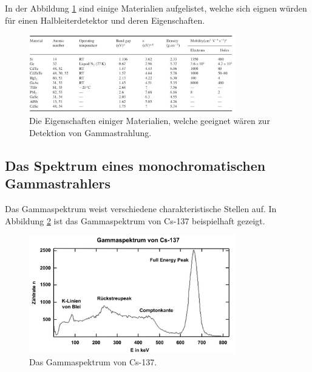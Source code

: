 In der Abbildung \ref{fig:halbleitermatrialien} sind einige Materialien aufgelistet, welche sich eignen würden für einen Halbleiterdetektor und deren Eigenschaften.

\begin{figure}[H]
    \centering
    \includegraphics[width=0.8\textwidth]{content/grafik/passende.jpg}
    \caption{Die Eigenschaften einiger Materialien, welche geeignet wären zur Detektion von Gammastrahlung. \cite{gamma_ray}}
    \label{fig:halbleitermatrialien}
\end{figure}

\subsection{Das Spektrum eines monochromatischen Gammastrahlers}
\label{sec:Gammastrahlung}

Das Gammaspektrum weist verschiedene charakteristische Stellen auf. In Abbildung \ref{fig:gamma-cs} ist das Gammaspektrum von
Cs-137 beispielhaft gezeigt.

\begin{figure}[H]
    \centering
    \includegraphics[width=0.8\textwidth]{content/grafik/Gammaspektrum.jpg}
    \caption{Das Gammaspektrum von Cs-137. \cite{Gammaspektrum}}
    \label{fig:gamma-cs}
\end{figure}

